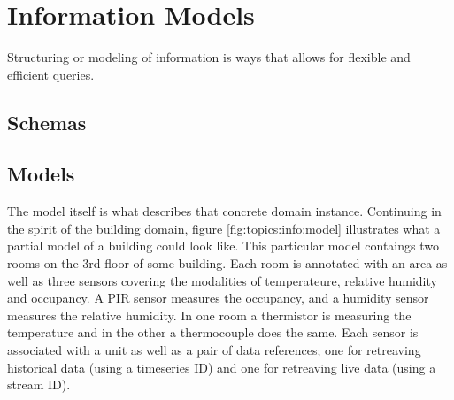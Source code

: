 


\section{Information Models}

Structuring or modeling of information is ways that allows for flexible and efficient queries.

\subsection{Schemas}

\subsection{Models}

The model itself is what describes that concrete domain instance. Continuing in the spirit of the building domain, figure \ref{fig:topics:info:model} illustrates what a partial model of a building could look like. This particular model contaings two rooms on the 3rd floor of some building. Each room is annotated with an area as well as three sensors covering the modalities of temperateure, relative humidity and occupancy. A PIR sensor measures the occupancy, and a humidity sensor measures the relative humidity. In one room a thermistor is measuring the temperature and in the other a thermocouple does the same. Each sensor is associated with a unit as well as a pair of data references; one for retreaving historical data (using a timeseries ID) and one for retreaving live data (using a stream ID).

